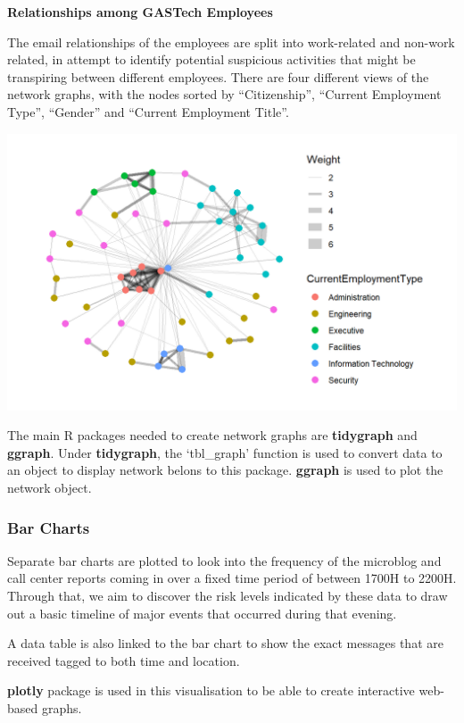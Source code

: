 \documentclass{acm_proc_article-sp}
\begin{document}
\textbf{Relationships among GASTech Employees}

The email relationships of the employees are split into work-related and
non-work related, in attempt to identify potential suspicious activities
that might be transpiring between different employees. There are four
different views of the network graphs, with the nodes sorted by
``Citizenship'', ``Current Employment Type'', ``Gender'' and ``Current
Employment Title''.

\includegraphics{img/image10.png}

The main R packages needed to create network graphs are
\textbf{tidygraph} and \textbf{ggraph}. Under \textbf{tidygraph}, the
`tbl\_graph' function is used to convert data to an object to display
network belons to this package. \textbf{ggraph} is used to plot the
network object.

\hypertarget{bar-charts}{%
\subsubsection{Bar Charts}\label{bar-charts}}

Separate bar charts are plotted to look into the frequency of the
microblog and call center reports coming in over a fixed time period of
between 1700H to 2200H. Through that, we aim to discover the risk levels
indicated by these data to draw out a basic timeline of major events
that occurred during that evening.

A data table is also linked to the bar chart to show the exact messages
that are received tagged to both time and location.

\textbf{plotly} package is used in this visualisation to be able to
create interactive web-based graphs.
\end{document}
